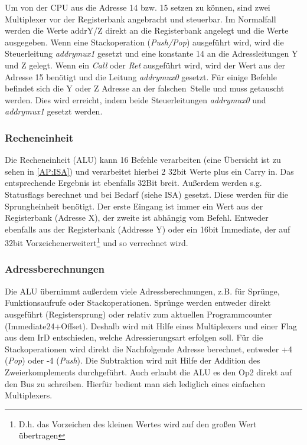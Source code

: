 Um von der CPU aus die Adresse 14 bzw. 15 setzen zu können, sind zwei Multiplexer vor der Registerbank angebracht und steuerbar. Im Normalfall werden die Werte addrY/Z direkt an die Registerbank angelegt und die Werte ausgegeben. Wenn eine Stackoperation (\emph{Push/Pop}) ausgeführt wird, wird die Steuerleitung \textit{addrymux1} gesetzt und eine konstante 14 an die Adressleitungen Y und Z gelegt. Wenn ein \emph{Call} oder \emph{Ret} ausgeführt wird, wird der Wert aus der Adresse 15 benötigt und die Leitung \textit{addrymux0} gesetzt. Für einige Befehle befindet sich die Y oder Z Adresse an der \glqq falschen\grqq \ Stelle und muss getauscht werden. Dies wird erreicht, indem beide Steuerleitungen \textit{addrymux0} und \textit{addrymux1} gesetzt werden.

\subsubsection{Recheneinheit}
Die Recheneinheit (ALU) kann 16 Befehle verarbeiten (eine Übersicht ist zu sehen in \autoref{AP:ISA}) und verarbeitet hierbei 2 32bit Werte plus ein Carry in. Das entsprechende Ergebnis ist ebenfalls 32Bit breit. Außerdem werden s.g. Statusflags berechnet und bei Bedarf (siehe ISA) gesetzt. Diese werden für die Sprungheinheit benötigt. Der erste Eingang ist immer ein Wert aus der Registerbank (Adresse X), der zweite ist abhängig vom Befehl. Entweder ebenfalls aus der Registerbank (Addresse Y) oder ein 16bit Immediate, der auf 32bit \glqq Vorzeichenerweitert\grqq \footnote{D.h. das Vorzeichen des kleinen Wertes wird auf den großen Wert übertragen} und so verrechnet wird.

\subsubsection{Adressberechnungen}
Die ALU übernimmt außerdem viele Adressberechnungen, z.B. für Sprünge, Funktionsaufrufe oder Stackoperationen.
Sprünge werden entweder direkt ausgeführt (Registersprung) oder relativ zum aktuellen Programmcounter (Immediate24+Offset). Deshalb wird mit Hilfe eines Multiplexers und einer Flag aus dem IrD entschieden, welche Adressierungsart erfolgen soll.
Für die Stackoperationen wird direkt die Nachfolgende Adresse berechnet, entweder +4 (\emph{Pop}) oder -4 (\emph{Push}). Die Subtraktion wird mit Hilfe der Addition des Zweierkomplements durchgeführt.
Auch erlaubt die ALU es den Op2 direkt auf den Bus zu schreiben. Hierfür bedient man sich lediglich eines einfachen Multiplexers.

